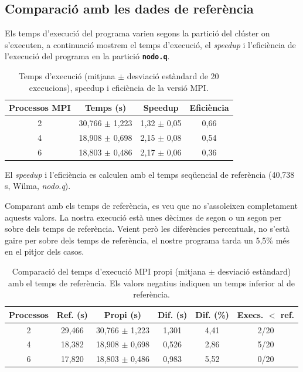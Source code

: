 \documentclass{article}
\begin{document}
\subsection{Comparació amb les dades de referència}

Els temps d'execució del programa varien segons la partició del clúster on s'executen, a continuació mostrem el temps d'execució, el \textit{speedup} i l'eficiència de l'execució del programa en la partició \texttt{\textbf{nodo.q}}.

\begin{table}[H]
\centering
\begin{tabular}{|c|c|c|c|}
\hline
\textbf{Processos MPI} & \textbf{Temps (s)} & \textbf{Speedup} & \textbf{Eficiència} \\ \hline
2 & 30,766 $\pm$ 1,223 & 1,32 $\pm$ 0,05 & 0,66 \\ \hline
4 & 18,908 $\pm$ 0,698 & 2,15 $\pm$ 0,08 & 0,54 \\ \hline
6 & 18,803 $\pm$ 0,486 & 2,17 $\pm$ 0,06 & 0,36 \\ \hline
\end{tabular}
\caption{Temps d'execució (mitjana $\pm$ desviació estàndard de 20 execucions), speedup i eficiència de la versió MPI.}
\label{tab:mpi_resultats}
\end{table}
El \textit{speedup} i l'eficiència es calculen amb el temps seqüencial de referència (40,738 s, Wilma, \textit{nodo.q}).

Comparant amb els temps de referència, es veu que no s'assoleixen completament aquests valors. La nostra execució està unes dècimes de segon o un segon per sobre dels temps de referència. Veient però les diferències percentuals, no s'està gaire per sobre dels temps de referència, el nostre programa tarda un 5,5\% més en el pitjor dels casos.
\begin{table}[H]
\centering
\begin{tabular}{|c|c|c|c|c|c|}
\hline
\textbf{Processos} & \textbf{Ref. (s)} & \textbf{Propi (s)} & \textbf{Dif. (s)} & \textbf{Dif. (\%)} & \textbf{Execs. $<$ ref.} \\ \hline
2 & 29,466 & 30,766 $\pm$ 1,223 & 1,301 & 4,41 & 2/20 \\ \hline
4 & 18,382 & 18,908 $\pm$ 0,698 & 0,526 & 2,86 & 5/20 \\ \hline
6 & 17,820 & 18,803 $\pm$ 0,486 & 0,983 & 5,52 & 0/20 \\ \hline
\end{tabular}
\caption{Comparació del temps d'execució MPI propi (mitjana $\pm$ desviació estàndard) amb el temps de referència. Els valors negatius indiquen un temps inferior al de referència.}
\label{tab:mpi_comp_temps}
\end{table}
\end{document}
